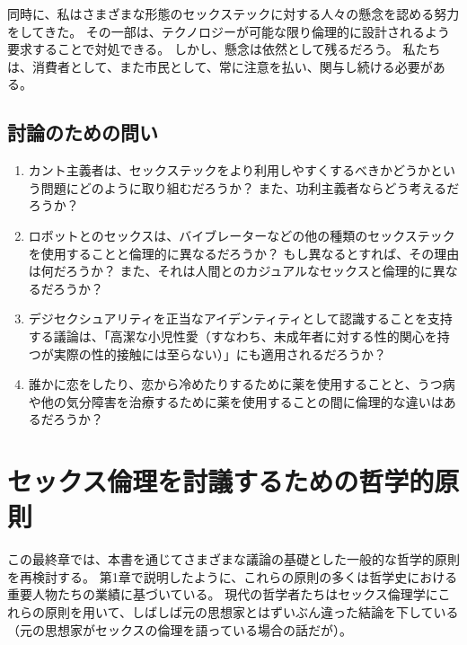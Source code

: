 \documentclass[paper=a4,book,openany]{jlreq}
\begin{document}
同時に、私はさまざまな形態のセックステックに対する人々の懸念を認める努力をしてきた。
その一部は、テクノロジーが可能な限り倫理的に設計されるよう要求することで対処できる。
しかし、懸念は依然として残るだろう。
私たちは、消費者として、また市民として、常に注意を払い、関与し続ける必要がある。

\section{討論のための問い}

\begin{enumerate}
 \item カント主義者は、セックステックをより利用しやすくするべきかどうかという問題にどのように取り組むだろうか？ また、功利主義者ならどう考えるだろうか？
 \item ロボットとのセックスは、バイブレーターなどの他の種類のセックステックを使用することと倫理的に異なるだろうか？ もし異なるとすれば、その理由は何だろうか？ また、それは人間とのカジュアルなセックスと倫理的に異なるだろうか？
 \item デジセクシュアリティを正当なアイデンティティとして認識することを支持する議論は、「高潔な小児性愛（すなわち、未成年者に対する性的関心を持つが実際の性的接触には至らない）」にも適用されるだろうか？
 \item 誰かに恋をしたり、恋から冷めたりするために薬を使用することと、うつ病や他の気分障害を治療するために薬を使用することの間に倫理的な違いはあるだろうか？
\end{enumerate}

\chapter{セックス倫理を討議するための哲学的原則}

この最終章では、本書を通じてさまざまな議論の基礎とした一般的な哲学的原則を再検討する。
第1章で説明したように、これらの原則の多くは哲学史における重要人物たちの業績に基づいている。
現代の哲学者たちはセックス倫理学にこれらの原則を用いて、しばしば元の思想家とはずいぶん違った結論を下している（元の思想家がセックスの倫理を語っている場合の話だが）。
\end{document}
